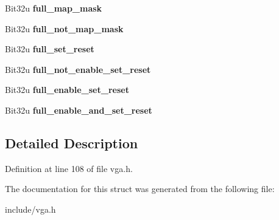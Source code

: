 \begin{DoxyCompactItemize}
\item 
\hypertarget{structVGA__Config_a4b6aad5a5153cac8c62619fec4fe15b4}{Bit32u {\bfseries full\-\_\-map\-\_\-mask}}\label{structVGA__Config_a4b6aad5a5153cac8c62619fec4fe15b4}

\item 
\hypertarget{structVGA__Config_a9621b79f2d85534101795b9a38e6c165}{Bit32u {\bfseries full\-\_\-not\-\_\-map\-\_\-mask}}\label{structVGA__Config_a9621b79f2d85534101795b9a38e6c165}

\item 
\hypertarget{structVGA__Config_ac7477048acf903ad2b40036fd7e17f8e}{Bit32u {\bfseries full\-\_\-set\-\_\-reset}}\label{structVGA__Config_ac7477048acf903ad2b40036fd7e17f8e}

\item 
\hypertarget{structVGA__Config_a7317f0353f9262ed950c47779ead4a45}{Bit32u {\bfseries full\-\_\-not\-\_\-enable\-\_\-set\-\_\-reset}}\label{structVGA__Config_a7317f0353f9262ed950c47779ead4a45}

\item 
\hypertarget{structVGA__Config_a045f0b43adea277828837e3cc956000e}{Bit32u {\bfseries full\-\_\-enable\-\_\-set\-\_\-reset}}\label{structVGA__Config_a045f0b43adea277828837e3cc956000e}

\item 
\hypertarget{structVGA__Config_ac1a974050a7c80f93935ad23fc5ba1f5}{Bit32u {\bfseries full\-\_\-enable\-\_\-and\-\_\-set\-\_\-reset}}\label{structVGA__Config_ac1a974050a7c80f93935ad23fc5ba1f5}

\end{DoxyCompactItemize}


\subsection{Detailed Description}


Definition at line 108 of file vga.\-h.



The documentation for this struct was generated from the following file\-:\begin{DoxyCompactItemize}
\item 
include/vga.\-h\end{DoxyCompactItemize}
